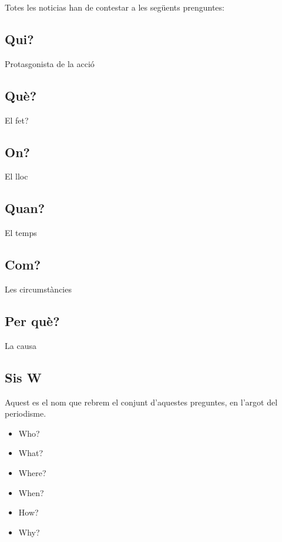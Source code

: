 \documentclass[
]{article}
\providecommand{\tightlist}{%
  \setlength{\itemsep}{0pt}\setlength{\parskip}{0pt}}
\begin{document}
Totes les noticias han de contestar a les següents prenguntes:

\hypertarget{qui}{%
\subsection{Qui?}\label{qui}}

Protasgonista de la acció

\hypertarget{quuxe8}{%
\subsection{Què?}\label{quuxe8}}

El fet?

\hypertarget{on}{%
\subsection{On?}\label{on}}

El lloc

\hypertarget{quan}{%
\subsection{Quan?}\label{quan}}

El temps

\hypertarget{com}{%
\subsection{Com?}\label{com}}

Les circumstàncies

\hypertarget{per-quuxe8}{%
\subsection{Per què?}\label{per-quuxe8}}

La causa

\hypertarget{sis-w}{%
\subsection{Sis W}\label{sis-w}}

Aquest es el nom que rebrem el conjunt d'aquestes preguntes, en l'argot
del periodisme.

\begin{itemize}
\tightlist
\item
  Who?
\item
  What?
\item
  Where?
\item
  When?
\item
  How?
\item
  Why?
\end{itemize}
\end{document}
